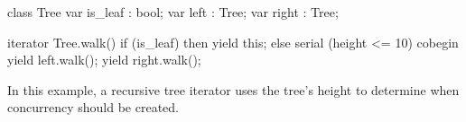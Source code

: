\begin{example}
\begin{chapel}      
class Tree {
  var is_leaf : bool;
  var left    : Tree;
  var right   : Tree;
}

iterator Tree.walk() {
  if (is_leaf) then
    yield this;
  else
    serial (height <= 10) cobegin {
      yield left.walk();
      yield right.walk();
    }
}
\end{chapel}
In this example, a recursive tree iterator uses the tree's height to
determine when concurrency should be created.
\end{example}

